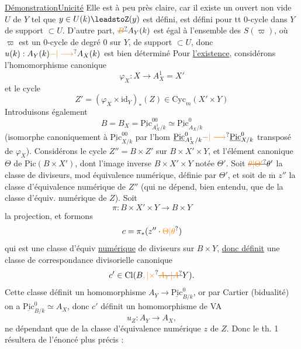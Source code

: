 \uline{Démonstration}\qquad \uline{Unicité} Elle est à peu près claire, car il existe un ouvert non vide $U$ de $Y$ tel que $y\in U(k)\leadstoZ(y)$ est défini,  est défini pour tt $0$-cycle dans $Y$ de support $\subset U$. D'autre part, $\deleted{\unsure{B}}A_Y(k)$ est égal à l'ensemble des $S(\varpi)$, où $\varpi$ est un  $0$-cycle de degré $0$ sur $Y$, de support $\subset U$, donc $u(k):A_Y(k)\unsure{-|\longrightarrow}A_X(k)$ est bien déterminé
Pour \uline{l'existence}, considérons l'homomorphisme canonique
\[
\varphi_X:X\longrightarrow A_X^1=X'
\]
et le cycle
\[
Z'=(\varphi_X\times\mathrm{id}_Y)_*(Z)\in\mathrm{Cyc}_m(X'\times Y)
\]
Introduisons également
\[
B=B_X=\underline{\mathrm{Pic}}^{00}_{A_X^1/k}\simeq\underline{\mathrm{Pic}}^0_{A_X/k}
\]
(isomorphe canoniquement à $\underline{\mathrm{Pic}}^{00}_{X/k}$ par l'hom $\underline{\mathrm{Pic}}^0_{A_X^1/k}\unsure{-|\longrightarrow}\underline{\mathrm{Pic}}^0_{X/k}$ transposé de $\varphi_X$). Considérons le cycle $Z''=B\times Z'$ sur $B\times X'\times Y$, et l'élément canonique $\Theta$ de $\mathrm{Pic}(B\times X')$, dont l'image inverse  $B\times X'\times Y$  notée $\Theta'$. Soit $\deleted{\unsure{\theta|\Theta'}}\theta'$ la classe de diviseurs, mod équivalence numérique, définie par $\Theta'$, et soit de $\overline{\mathrm{m}}$ $z''$ la classe d'équivalence numérique de $Z''$ (qui ne dépend, bien entendu, que de la classe d'équiv. numérique de $Z$). Soit \deleted{$\unsure{\pi:}$}
\[
\pi:B\times X'\times Y\longrightarrow B\times Y
\]
la projection, et formons
\[
c=\pi_*(z''\cdot\unsure{\Theta|\theta})
\]
qui est une classe d'équiv \uline{numérique} de diviseurs sur $B\times Y$, \uline{donc définit} une classe
de correspondance divisorielle canonique
\[
c'\in\mathrm{Cl}(B\unsure{,|\times}\deleted{\unsure{A_Y|A}}Y).
\]
 Cette classe définit un homomorphisme  $A_Y\longrightarrow\underline{\mathrm{Pic}}^0_{B/k}$, or par Cartier (bidualité) on a  $\underline{\mathrm{Pic}}^0_{B/k}\simeq A_X$, donc $c'$ définit un  homomorphisme de VA
\[
u_Z:A_Y\longrightarrow A_X,
\]
ne dépendant que de la classe d'équivalence numérique $z$ de $Z$. Donc le th. 1 résultera de l'énoncé plus précis :

